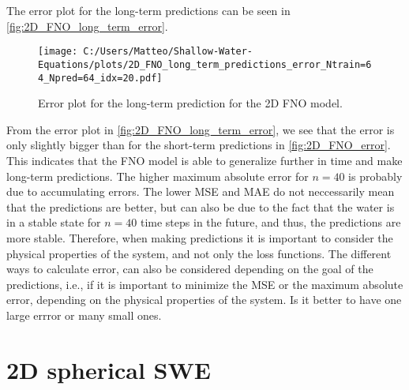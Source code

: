 The error plot for the long-term predictions can be seen in \autoref{fig:2D_FNO_long_term_error}.
\begin{figure}[H]
    \centering
    \texttt{[image: C:/Users/Matteo/Shallow-Water-Equations/plots/2D\_FNO\_long\_term\_predictions\_error\_Ntrain=64\_Npred=64\_idx=20.pdf]}
    \caption{Error plot for the long-term prediction for the 2D FNO model.}\label{fig:2D_FNO_long_term_error}
\end{figure}
From the error plot in \autoref{fig:2D_FNO_long_term_error}, we see that the error is only slightly bigger than for the short-term predictions in \autoref{fig:2D_FNO_error}.
This indicates that the FNO model is able to generalize further in time and make long-term predictions.
The higher maximum absolute error for $n = 40$ is probably due to accumulating errors. 
The lower MSE and MAE do not neccessarily mean that the predictions are better, but can also be due to the fact that the water is in a stable state for $n = 40$ time steps in the future, and thus, the predictions are more stable.
Therefore, when making predictions it is important to consider the physical properties of the system, and not only the loss functions.
The different ways to calculate error, can also be considered depending on the goal of the predictions, i.e., if it is important to minimize the MSE or the maximum absolute error, depending on the physical properties of the system.
Is it better to have one large errror or many small ones.







\section{2D spherical SWE}




